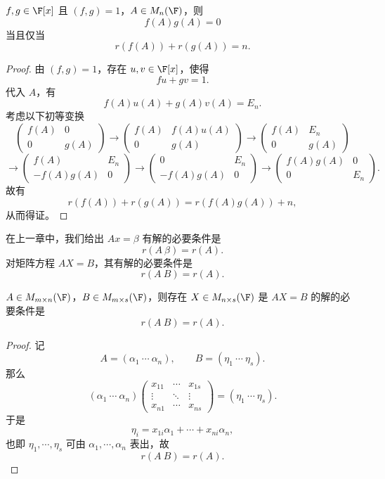 \begin{proposition}\label{3.5.6}
	$f,g\in\F[x]$ 且 $(f,g)=1$，$A\in M_n(\F)$，则
	\[
	f(A)g(A)=0
	\]
	当且仅当
	\[
	r(f(A))+r(g(A))=n.
	\]
\end{proposition}

\begin{proof}
	由 $(f,g)=1$，存在 $u,v\in\F[x]$，使得
	\[
	fu+gv=1.
	\]
	代入 $A$，有
	\[
	f(A)u(A)+g(A)v(A)=E_n.
	\]
	考虑以下初等变换
	\[
	\begin{pmatrix}
		f(A)&0\\
		0&g(A)
	\end{pmatrix}
	\longrightarrow
	\begin{pmatrix}
		f(A)&f(A)u(A)\\
		0&g(A)
	\end{pmatrix}
	\longrightarrow
	\begin{pmatrix}
		f(A)&E_n\\
		0&g(A)
	\end{pmatrix}
	\]
	\[
	\longrightarrow
	\begin{pmatrix}
		f(A)&E_n\\
		-f(A)g(A)&0
	\end{pmatrix}
	\longrightarrow
	\begin{pmatrix}
		0&E_n\\
		-f(A)g(A)&0
	\end{pmatrix}
	\longrightarrow
	\begin{pmatrix}
		f(A)g(A)&0\\
		0&E_n
	\end{pmatrix}.
	\]
	故有
	\[
	r(f(A))+r(g(A))=r(f(A)g(A))+n,
	\]
	从而得证。
\end{proof}

在上一章中，我们给出 $Ax=\beta$ 有解的必要条件是
\[
r(A\ \beta)=r(A).
\]
对矩阵方程 $AX=B$，其有解的必要条件是
\[
r(A\ B)=r(A).
\]

\begin{proposition}\label{3.5.7}
	$A\in M_{m\times n}(\F)$，$B\in M_{m\times s}(\F)$，则存在 $X\in M_{n\times s}(\F)$ 是 $AX=B$ 的解的必要条件是
	\[
	r(A\ B)=r(A).
	\]
\end{proposition}

\begin{proof}
	记
	\[
	A=(\alpha_1\ \cdots\ \alpha_n),
	\qquad
	B=(\eta_1\ \cdots\ \eta_s).
	\]
	那么
	\[
	(\alpha_1\ \cdots\ \alpha_n)
	\begin{pmatrix}
		x_{11}&\cdots&x_{1s}\\
		\vdots&\ddots&\vdots\\
		x_{n1}&\cdots&x_{ns}
	\end{pmatrix}
	=(\eta_1\ \cdots\ \eta_s).
	\]
	于是
	\[
	\eta_i=x_{1i}\alpha_1+\cdots+x_{ni}\alpha_n,
	\]
	也即 $\eta_1,\cdots,\eta_s$ 可由 $\alpha_1,\cdots,\alpha_n$ 表出，故
	\[
	r(A\ B)=r(A).
	\]
\end{proof}

